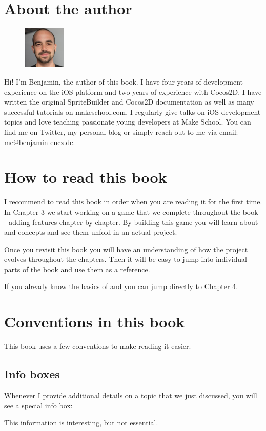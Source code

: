 \section{About the author}
\begin{figure}
    \includegraphics[width=0.18\textwidth]{images/Chapter1/benji.png}
\end{figure}
Hi! I'm Benjamin, the author of this book. I have four years of development experience on the iOS platform and two years of experience with Cocos2D.
I have written the original SpriteBuilder and Cocos2D documentation as well as many successful tutorials on makeschool.com. I regularly give talks on iOS development topics and love teaching passionate young developers at Make School. You can find me on Twitter, my personal blog or simply reach out to me via email: me@benjamin-encz.de.

\section{How to read this book}
I recommend to read this book in order when you are reading it for the first
time. In Chapter 3 we start working on a game that we complete throughout the
book - adding features chapter by chapter. By building this game you will learn
about \SB{} and \cocos{} concepts and see them unfold in an actual project.

Once you revisit this book you will have an understanding of how the project
evolves throughout the chapters. Then it will be easy to jump into individual
parts of the book and use them as a reference.

If you already know the basics of \cocos{} and \SB{} you can jump directly to
Chapter 4.

\section{Conventions in this book}
This book uses a few conventions to make reading it easier. 

\subsection{Info boxes}
Whenever I provide additional details on a topic that we just discussed, you
will see a special info box:
\begin{details}
This information is interesting, but not essential.
\end{details}

